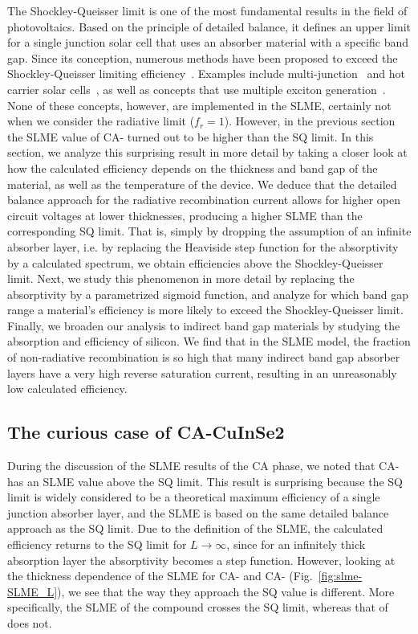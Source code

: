 \begin{refsection}
The Shockley-Queisser limit is one of the most fundamental results in the 
field of photovoltaics. Based on the principle of detailed balance, it defines 
an upper limit for a single junction solar cell that uses an absorber material 
with a specific band gap. Since its conception, numerous methods have been 
proposed to exceed the Shockley-Queisser limiting 
efficiency~\cite{Nelson2013}. Examples include multi-junction~\cite{Shah2004, 
Heremans2009} and hot carrier solar cells~\cite{Konig2010}, as well as 
concepts that use multiple exciton generation~\cite{Hanna2006}. None of these 
concepts, however, are implemented in the SLME, certainly not when we consider 
the radiative limit ($f_r = 1$). However, in the previous section the SLME 
value of CA- turned out to be higher than the SQ limit. In this 
section, we analyze this surprising result in more detail by taking a closer 
look at how the calculated efficiency depends on the thickness and band gap of 
the material, as well as the temperature of the device. We deduce that the 
detailed balance approach for the radiative recombination current allows for 
higher open circuit voltages at lower thicknesses, producing a higher SLME 
than the corresponding SQ limit. That is, simply by dropping the assumption of 
an infinite absorber layer, i.e. by replacing the Heaviside step function for 
the absorptivity by a calculated spectrum, we obtain efficiencies above the 
Shockley-Queisser limit. Next, we study this phenomenon in more detail by 
replacing the absorptivity by a parametrized sigmoid function, and analyze for 
which band gap range a material's efficiency is more likely to exceed the 
Shockley-Queisser limit. Finally, we broaden our analysis to indirect band gap 
materials by studying the absorption and efficiency of silicon. We find that 
in the SLME model, the fraction of non-radiative recombination is so high that 
many indirect band gap absorber layers have a very high reverse saturation 
current, resulting in an unreasonably low calculated efficiency.  
 
\subsection{The curious case of CA-CuInSe2} \label{sec:slme-CuInSe2} 
 
During the discussion of the SLME results of the CA phase, we noted that 
\mbox{CA-} has an SLME value above the SQ limit. This result is 
surprising because the SQ limit is widely considered to be a theoretical 
maximum efficiency of a single junction absorber layer, and the SLME is based 
on the same detailed balance approach as the SQ limit. Due to the definition 
of the SLME, the calculated efficiency returns to the SQ limit for \mbox{$L 
\rightarrow \infty$}, since for an infinitely thick absorption layer the 
absorptivity becomes a step function. However, looking at the thickness 
dependence of the SLME for \mbox{CA-} and \mbox{CA-} 
(Fig.~\ref{fig:slme-SLME_L}), we see that the way they approach the SQ value 
is different. More specifically, the SLME of the compound  crosses 
the SQ limit, whereas that of  does not. 
 

\end{refsection}
